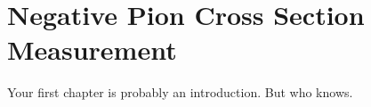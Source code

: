 \chapter{Negative Pion Cross Section Measurement}
Your first chapter is probably an introduction. But who knows.